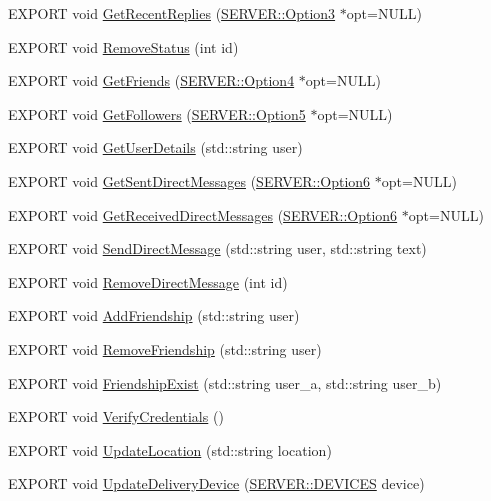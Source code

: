 \begin{CompactItemize}
\item 
EXPORT void \hyperlink{classQTwitLib_60fc1eae15a11b68583c6610aaaccec3}{GetRecentReplies} (\hyperlink{structSERVER_1_1Option3}{SERVER::Option3} $\ast$opt=NULL)
\item 
EXPORT void \hyperlink{classQTwitLib_8d5971709c2feaa30193fcb2918017f9}{RemoveStatus} (int id)
\item 
EXPORT void \hyperlink{classQTwitLib_c3850ca7725d87d78c57a2dfb298af9f}{GetFriends} (\hyperlink{structSERVER_1_1Option4}{SERVER::Option4} $\ast$opt=NULL)
\item 
EXPORT void \hyperlink{classQTwitLib_e4bdc7e46040d27e8945b912a9f84541}{GetFollowers} (\hyperlink{structSERVER_1_1Option5}{SERVER::Option5} $\ast$opt=NULL)
\item 
EXPORT void \hyperlink{classQTwitLib_9361839a5b059781f143e237dc31fddb}{GetUserDetails} (std::string user)
\item 
EXPORT void \hyperlink{classQTwitLib_9171d183e65f495b24d98d8440f037b7}{GetSentDirectMessages} (\hyperlink{structSERVER_1_1Option6}{SERVER::Option6} $\ast$opt=NULL)
\item 
EXPORT void \hyperlink{classQTwitLib_e74e86c34e908189d4ae40359daa48e2}{GetReceivedDirectMessages} (\hyperlink{structSERVER_1_1Option6}{SERVER::Option6} $\ast$opt=NULL)
\item 
EXPORT void \hyperlink{classQTwitLib_da8e53e355f2c5f13affe2d59e4e9279}{SendDirectMessage} (std::string user, std::string text)
\item 
EXPORT void \hyperlink{classQTwitLib_a67bee8da6dc22a60d8d16ae02dda240}{RemoveDirectMessage} (int id)
\item 
EXPORT void \hyperlink{classQTwitLib_23d0817187f9fdb91310395e668b52ed}{AddFriendship} (std::string user)
\item 
EXPORT void \hyperlink{classQTwitLib_989786fb8d1d013fdffb11c5fff157e1}{RemoveFriendship} (std::string user)
\item 
EXPORT void \hyperlink{classQTwitLib_fc32d1e3393877f561c680b680d86730}{FriendshipExist} (std::string user\_\-a, std::string user\_\-b)
\item 
EXPORT void \hyperlink{classQTwitLib_893a5f44401cd8d82ed7e703ad914bb3}{VerifyCredentials} ()
\item 
EXPORT void \hyperlink{classQTwitLib_e5cf26304dbf16a676503ae6c00dae0c}{UpdateLocation} (std::string location)
\item 
EXPORT void \hyperlink{classQTwitLib_38f917ae2aacd9c9d6f66ad9d2149f58}{UpdateDeliveryDevice} (\hyperlink{namespaceSERVER_354160f0b752453a760c63ec882c8c87}{SERVER::DEVICES} device)

\end{CompactItemize}
